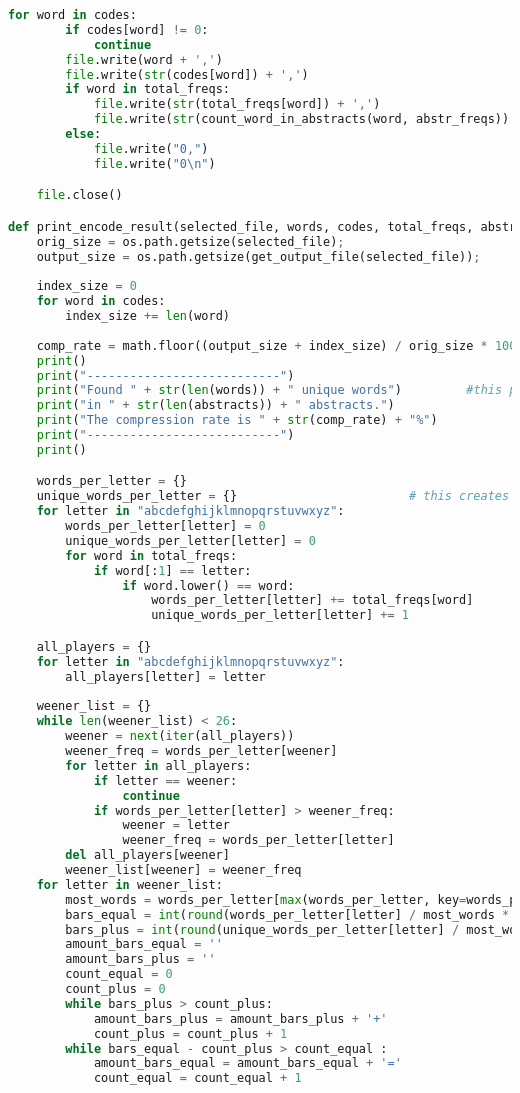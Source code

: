 \documentclass{article}
\begin{document}
\begin{lstlisting}[language=Python]
    for word in codes:
        if codes[word] != 0:
            continue
        file.write(word + ',')
        file.write(str(codes[word]) + ',')
        if word in total_freqs:
            file.write(str(total_freqs[word]) + ',')
            file.write(str(count_word_in_abstracts(word, abstr_freqs)) + '\n')
        else:
            file.write("0,")
            file.write("0\n")

    file.close()

def print_encode_result(selected_file, words, codes, total_freqs, abstracts):
    orig_size = os.path.getsize(selected_file);
    output_size = os.path.getsize(get_output_file(selected_file));
    
    index_size = 0
    for word in codes:
        index_size += len(word)
    
    comp_rate = math.floor((output_size + index_size) / orig_size * 100) #comperssion rate calculator
    print()
    print("---------------------------")
    print("Found " + str(len(words)) + " unique words")         #this prints the amount of unique words found in how many abstracts
    print("in " + str(len(abstracts)) + " abstracts.")
    print("The compression rate is " + str(comp_rate) + "%")
    print("---------------------------")
    print()

    words_per_letter = {}
    unique_words_per_letter = {}                        # this creates dicts for the letters per word and the amount of unique letters per word
    for letter in "abcdefghijklmnopqrstuvwxyz":
        words_per_letter[letter] = 0
        unique_words_per_letter[letter] = 0
        for word in total_freqs:
            if word[:1] == letter:
                if word.lower() == word:
                    words_per_letter[letter] += total_freqs[word]
                    unique_words_per_letter[letter] += 1 

    all_players = {}
    for letter in "abcdefghijklmnopqrstuvwxyz":
        all_players[letter] = letter
        
    weener_list = {}
    while len(weener_list) < 26:
        weener = next(iter(all_players))
        weener_freq = words_per_letter[weener]
        for letter in all_players:
            if letter == weener:
                continue
            if words_per_letter[letter] > weener_freq:
                weener = letter
                weener_freq = words_per_letter[letter]
        del all_players[weener]
        weener_list[weener] = weener_freq        
    for letter in weener_list:
        most_words = words_per_letter[max(words_per_letter, key=words_per_letter.get)]
        bars_equal = int(round(words_per_letter[letter] / most_words * 40))
        bars_plus = int(round(unique_words_per_letter[letter] / most_words * 40))               #this calculates how many + and = has to be printed in the textual histogram
        amount_bars_equal = ''
        amount_bars_plus = ''
        count_equal = 0
        count_plus = 0
        while bars_plus > count_plus:
            amount_bars_plus = amount_bars_plus + '+'
            count_plus = count_plus + 1
        while bars_equal - count_plus > count_equal :
            amount_bars_equal = amount_bars_equal + '='
            count_equal = count_equal + 1
        

\end{lstlisting}
\end{document}
